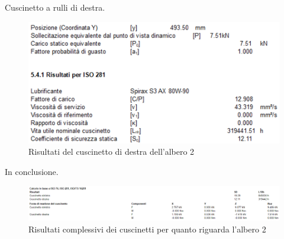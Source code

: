 Cuscinetto a rulli di destra.
\begin{figure}[h]
    \centering
    \includegraphics[scale=0.6]{Immagini/RisultatiCuscinettoDestraAlbero2.png}
    \caption{Risultati del cuscinetto di destra dell'albero 2}
    \label{fig:RisultatiCuscinettoDestraAlbero2}
\end{figure}

In conclusione.
\begin{figure}[h]
    \centering
    \includegraphics[scale=0.55]{Immagini/RisultatiCuscinettiAlbero2.png}
    \caption{Risultati complessivi dei cuscinetti per quanto riguarda l'albero 2}
    \label{fig:RisultatiCuscinettiAlbero2}
\end{figure}

